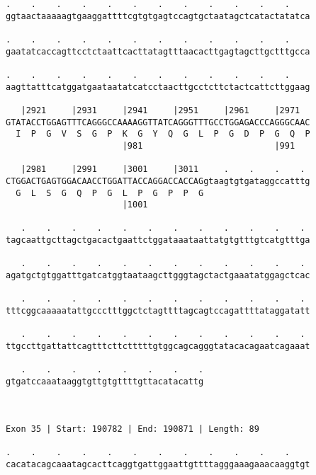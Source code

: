 \documentclass{article}
\begin{document}
\begin{Verbatim}
.    .    .    .    .    .    .    .    .    .    .    .    
ggtaactaaaaagtgaaggattttcgtgtgagtccagtgctaatagctcatactatatca
                                                            
.    .    .    .    .    .    .    .    .    .    .    .    
gaatatcaccagttcctctaattcacttatagtttaacacttgagtagcttgctttgcca
                                                            
.    .    .    .    .    .    .    .    .    .    .    .    
aagttatttcatggatgaataatatcatcctaacttgcctcttctactcattcttggaag
                                                            
   |2921     |2931     |2941     |2951     |2961     |2971  
GTATACCTGGAGTTTCAGGGCCAAAAGGTTATCAGGGTTTGCCTGGAGACCCAGGGCAAC
  I  P  G  V  S  G  P  K  G  Y  Q  G  L  P  G  D  P  G  Q  P
                       |981                          |991   
  
   |2981     |2991     |3001     |3011     .    .    .    . 
CTGGACTGAGTGGACAACCTGGATTACCAGGACCACCAGgtaagtgtgataggccatttg
  G  L  S  G  Q  P  G  L  P  G  P  P  G                     
                       |1001                                
  
   .    .    .    .    .    .    .    .    .    .    .    . 
tagcaattgcttagctgacactgaattctggataaataattatgtgtttgtcatgtttga
                                                            
   .    .    .    .    .    .    .    .    .    .    .    . 
agatgctgtggatttgatcatggtaataagcttgggtagctactgaaatatggagctcac
                                                            
   .    .    .    .    .    .    .    .    .    .    .    . 
tttcggcaaaaatattgccctttggctctagttttagcagtccagattttataggatatt
                                                            
   .    .    .    .    .    .    .    .    .    .    .    . 
ttgccttgattattcagtttcttctttttgtggcagcagggtatacacagaatcagaaat
                                                            
   .    .    .    .    .    .    .    .
gtgatccaaataaggtgttgtgttttgttacatacattg
                                       
                                       
 
Exon 35 | Start: 190782 | End: 190871 | Length: 89
 
.    .    .    .    .    .    .    .    .    .    .    .    
cacatacagcaaatagcacttcaggtgattggaattgttttagggaaagaaacaaggtgt
                                                            

\end{Verbatim}
\end{document}
